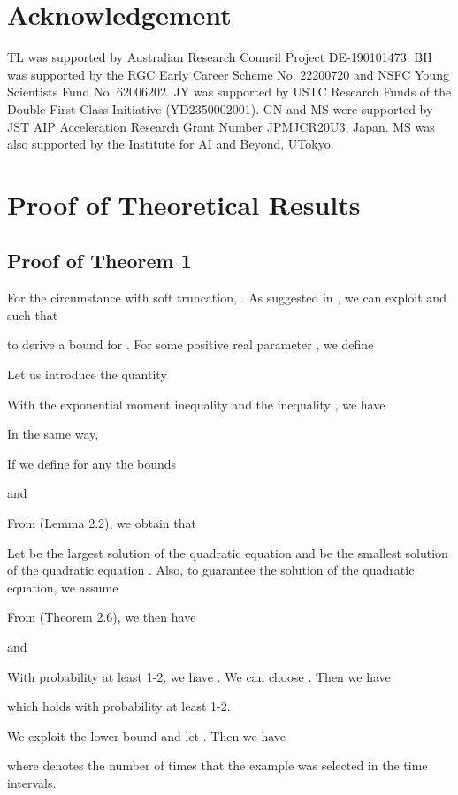 \documentclass[11pt]{article}
\begin{document}
\section*{Acknowledgement}
TL was supported by Australian Research Council Project DE-190101473. BH was supported by the RGC Early Career Scheme No. 22200720 and NSFC Young Scientists Fund No. 62006202. JY was supported by USTC Research Funds of the Double First-Class Initiative (YD2350002001). GN and MS were supported by JST AIP Acceleration Research Grant Number JPMJCR20U3, Japan. MS was also supported by the Institute for AI and Beyond, UTokyo.

\appendix

\section{Proof of Theoretical Results}
\subsection{Proof of Theorem 1}
For the circumstance with soft truncation, . As suggested in \cite{catoni2012challenging}, we can exploit  and  such that 

to derive a bound for . For some positive real parameter , we define 

Let us introduce the quantity

With the exponential moment inequality \cite{gine2000exponential} and the  inequality \cite{mohri2018foundations}, we have 


In the same way,


If we define for any  the bounds

and 


From \cite{chen2020generalized} (Lemma 2.2), we obtain that 

Let  be the largest solution of the quadratic equation  and  be the smallest solution of the quadratic equation . Also, to guarantee the solution of the quadratic equation, we assume 


From \cite{chen2020generalized} (Theorem 2.6), we then have 


and 

With probability at least 1-2, we have . We can
choose . Then we have 

which holds with probability at least 1-2. 

We exploit the lower bound and let . Then we have

where  denotes the number of times that the example was selected in the time intervals.
\end{document}
